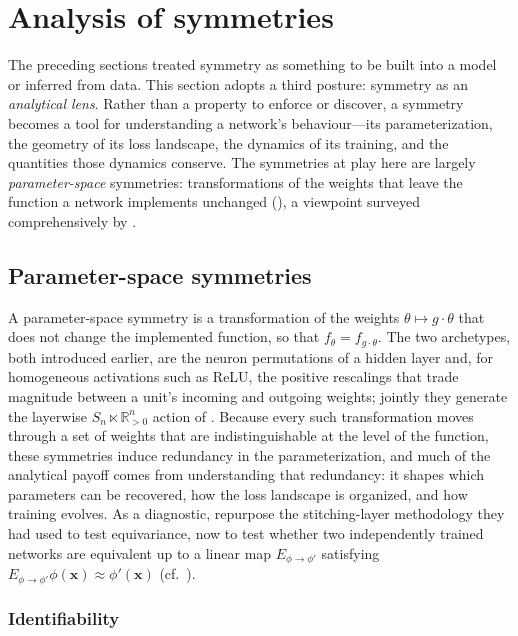 \documentclass[mathematics,review,submit,moreauthors]{Definitions/mdpi}
\begin{document}
\section{Analysis of symmetries}

The preceding sections treated symmetry as something to be built into a model or inferred from data.
This section adopts a third posture: symmetry as an \emph{analytical lens}.
Rather than a property to enforce or discover, a symmetry becomes a tool for understanding a network's behaviour---its parameterization, the geometry of its loss landscape, the dynamics of its training, and the quantities those dynamics conserve.
The symmetries at play here are largely \emph{parameter-space} symmetries: transformations of the weights that leave the function a network implements unchanged (), a viewpoint surveyed comprehensively by \citet{zhao2025}.

\subsection{Parameter-space symmetries}

A parameter-space symmetry is a transformation of the weights $\theta \mapsto g\cdot\theta$ that does not change the implemented function, so that $f_{\theta} = f_{g\cdot\theta}$.
The two archetypes, both introduced earlier, are the neuron permutations of a hidden layer and, for homogeneous activations such as ReLU, the positive rescalings that trade magnitude between a unit's incoming and outgoing weights; jointly they generate the layerwise $S_n \ltimes \mathbb{R}_{>0}^n$ action of .
Because every such transformation moves through a set of weights that are indistinguishable at the level of the function, these symmetries induce redundancy in the parameterization, and much of the analytical payoff comes from understanding that redundancy: it shapes which parameters can be recovered, how the loss landscape is organized, and how training evolves.
As a diagnostic, \citet{lenc2014a} repurpose the stitching-layer methodology they had used to test equivariance, now to test whether two independently trained networks are equivalent up to a linear map $E_{\phi\to\phi'}$ satisfying $E_{\phi\to\phi'}\phi(\mathbf{x}) \approx \phi'(\mathbf{x})$ (cf.\ ).

\subsubsection{Identifiability}
\end{document}
